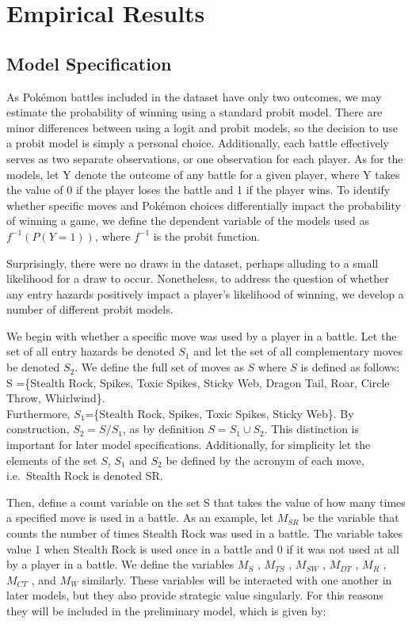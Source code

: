 \documentclass[12pt,twoside]{reedthesis}
\begin{document}
  \chapter{Empirical Results}\label{empirical-results}
  
  \section{Model Specification}\label{model-specification}
  
  As Pokémon battles included in the dataset have only two outcomes, we
  may estimate the probability of winning using a standard probit model.
  There are minor differences between using a logit and probit models, so
  the decision to use a probit model is simply a personal choice.
  Additionally, each battle effectively serves as two separate
  observations, or one observation for each player. As for the models, let
  Y denote the outcome of any battle for a given player, where Y takes the
  value of 0 if the player loses the battle and 1 if the player wins. To
  identify whether specific moves and Pokémon choices differentially
  impact the probability of winning a game, we define the dependent
  variable of the models used as \(f^{-1}(P(Y=1))\), where \(f^{-1}\) is
  the probit function.
  
  Surprisingly, there were no draws in the dataset, perhaps alluding to a
  small likelihood for a draw to occur. Nonetheless, to address the
  question of whether any entry hazards positively impact a player's
  likelihood of winning, we develop a number of different probit models.
  
  We begin with whether a specific move was used by a player in a battle.
  Let the set of all entry hazards be denoted \(S_1\) and let the set of
  all complementary moves be denoted \(S_2\). We define the full set of
  moves as \(S\) where \(S\) is defined as follows: S =\{Stealth Rock,
  Spikes, Toxic Spikes, Sticky Web, Dragon Tail, Roar, Circle Throw,
  Whirlwind\}.\\
  Furthermore, \(S_1\)=\{Stealth Rock, Spikes, Toxic Spikes, Sticky Web\}.
  By construction, \(S_2 = S/S_1\), as by definition \(S=S_1 \cup S_2\).
  This distinction is important for later model specifications.
  Additionally, for simplicity let the elements of the set \(S\), \(S_1\)
  and \(S_2\) be defined by the acronym of each move, i.e.~Stealth Rock is
  denoted SR.
  
  Then, define a count variable on the set S that takes the value of how
  many times a specified move is used in a battle. As an example, let
  \(M_{SR}\) be the variable that counts the number of times Stealth Rock
  was used in a battle. The variable takes value 1 when Stealth Rock is
  used once in a battle and 0 if it was not used at all by a player in a
  battle. We define the variables \(M_S\) , \(M_{TS}\) , \(M_{SW}\) ,
  \(M_{DT}\) , \(M_R\) , \(M_{CT}\) , and \(M_W\) similarly. These
  variables will be interacted with one another in later models, but they
  also provide strategic value singularly. For this reasons they will be
  included in the preliminary model, which is given by:
  
\end{document}
